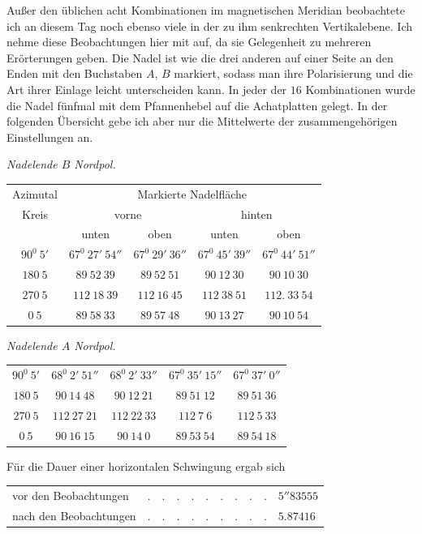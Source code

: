 Außer den üblichen acht Kombinationen im magnetischen Meridian beobachtete ich an diesem Tag noch ebenso viele in der zu ihm senkrechten Vertikalebene. Ich nehme diese Beobachtungen hier mit auf, da sie Gelegenheit zu mehreren Erörterungen geben. Die Nadel ist wie die drei anderen auf einer Seite an den Enden mit den Buchstaben $A$, $B$ markiert, sodass man ihre Polarisierung und die Art ihrer Einlage leicht unterscheiden kann. In jeder der $16$ Kombinationen wurde die Nadel fünfmal mit dem Pfannenhebel auf die Achatplatten gelegt. In der folgenden Übersicht gebe ich aber nur die Mittelwerte der zusammengehörigen Einstellungen an.

\begin{center}
\textit{Nadelende $B$ Nordpol.}\par\smallskip
{\fontsize{9}{11}\selectfont
\begin{tabular}{c||cc||cc}
Azimutal&\multicolumn{4}{c}{Markierte Nadelfläche}\\
Kreis&\multicolumn{2}{c||}{vorne}&\multicolumn{2}{c}{hinten}\\
&unten&oben&unten&oben\\\hline
$90^0\ 5'$&$67^0\ 27'\ 54''$&$67^0\ 29'\ 36''$&$67^0\ 45'\ 39''$&$67^0\ 44'\ 51''$\\
$180\ 5$&$89\ 52\ 39$&$89\ 52\ 51$&$90\ 12\ 30$&$90\ 10\ 30$\\
$270\ 5$&$112\ 18\ 39$&$112\ 16\ 45$&$112\ 38\ 51$&$112.\ 33\ 54$\\
$0\ 5$&$89\ 58\ 33$&$89\ 57\ 48$&$90\ 13\ 27$&$90\ 10\ 54$
\end{tabular}}
\par\medskip
\textit{Nadelende $A$ Nordpol.}\par\smallskip
{\fontsize{9}{11}\selectfont
\begin{tabular}{c||cc||cc}
$90^0\ 5'$&$68^0\ 2'\ 51''$&$68^0\ 2'\ 33''$&$67^0\ 35'\ 15''$&$67^0\ 37'\ 0''$\\
$180\ 5$&$90\ 14\ 48$&$90\ 12\ 21$&$89\ 51\ 12$&$89\ 51\ 36$\\
$270\ 5$&$112\ 27\ 21$&$112\ 22\ 33$&$112\ 7\ 6$&$112\ 5\ 33$\\
$0\ 5$&$90\ 16\ 15$&$90\ 14\ 0$&$89\ 53\ 54$&$89\ 54\ 18$
\end{tabular}}
\end{center}

Für die Dauer einer horizontalen Schwingung ergab sich
\begin{center}
\begin{tabular}{lll}
vor den Beobachtungen&$.\quad.\quad.\quad.\quad.\quad.\quad.\quad.\quad.$&$5''83555$\\
nach den Beobachtungen&$.\quad.\quad.\quad.\quad.\quad.\quad.\quad.\quad.$&$5.87416$
\end{tabular}
\end{center}

